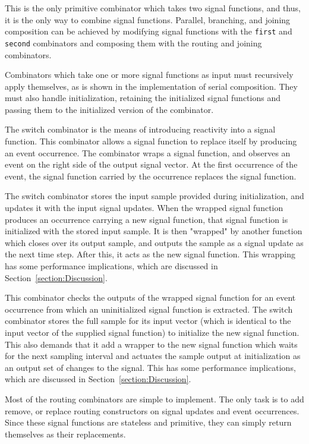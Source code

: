 This is the only primitive combinator which takes two signal functions, and
thus, it is the only way to combine signal functions. Parallel, branching, and
joining composition can be achieved by modifying signal functions with the
{\tt first} and {\tt second} combinators and composing them with the
routing and joining combinators.

Combinators which take one or more signal functions as input must recursively
apply themselves, as is shown in the implementation of serial composition.
They must also
handle initialization, retaining the initialized signal functions and passing
them to the initialized version of the combinator.

The switch combinator is the means of introducing reactivity into a signal
function. This combinator allows a signal function to replace itself by
producing an event occurrence. The combinator wraps a signal function, and 
observes an event on the right side of the output signal vector. At the first
occurrence of the event, the signal function carried by the occurrence replaces
the signal function. 

The switch combinator stores the input sample provided during initialization,
and updates it with the input signal updates. When the wrapped signal function
produces an occurrence carrying a new signal function, that signal function is
initialized with the stored input sample. It is then "wrapped" by another
function which closes over its output sample, and outputs the sample as a signal
update as the next time step. After this, it acts as the new signal function.
This wrapping has some performance implications, which are discussed in Section~\ref{section:Discussion}.

This combinator checks the outputs of the wrapped
signal function for an event occurrence from which an uninitialized signal
function is extracted. The switch combinator stores the full sample
for its input vector (which is identical to the input vector of the supplied
signal function) to initialize the new signal function. This also demands that
it add a wrapper to the new signal function which waits for the next sampling
interval and actuates the sample output at initialization as an output set
of changes to the signal. This has some performance implications, which are
discussed in Section~\ref{section:Discussion}.

Most of the routing combinators are simple to implement. The only task is to add
remove, or replace routing constructors on signal updates and event occurrences.
Since these signal functions are stateless and primitive, they can simply
return themselves as their replacements.

